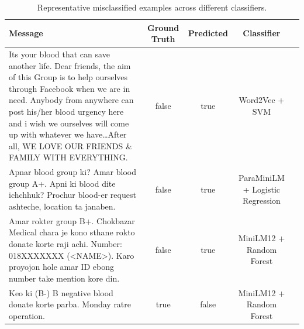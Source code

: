 \documentclass[11pt]{article}
\begin{document}
\begin{table}[t]
\centering
\small
\caption{Representative misclassified examples across different classifiers.}
\label{tab:misclassified-examples}
\begin{tabularx}{\textwidth}{@{}Xcccl@{}}
\toprule
\textbf{Message} & \textbf{Ground Truth} & \textbf{Predicted} & \textbf{Classifier} \\
\midrule
Its your blood that can save another life. Dear friends, the aim of this Group is to help ourselves through Facebook when we are in need. Anybody from anywhere can post his/her blood urgency here and i wish we ourselves will come up with whatever we have\ldots After all, WE LOVE OUR FRIENDS \& FAMILY WITH EVERYTHING. &
false & true & Word2Vec + SVM \\
\midrule
Apnar blood group ki? Amar blood group A+. Apni ki blood dite ichchhuk? Prochur blood-er request ashteche, location ta janaben. &
false & true & ParaMiniLM + Logistic Regression \\
\midrule
Amar rokter group B+. Chokbazar Medical chara je kono sthane rokto donate korte raji achi. Number: 018XXXXXXX (<NAME>). Karo proyojon hole amar ID ebong number take mention kore din. &
false & true & MiniLM12 + Random Forest \\
\midrule
Keo ki (B-) B negative blood donate korte parba. Monday ratre operation. &
true & false & MiniLM12 + Random Forest \\
\bottomrule
\end{tabularx}
\end{table}
\end{document}
